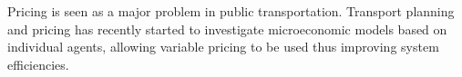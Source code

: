 Pricing is seen as a major problem in public transportation.
Transport planning and pricing has recently started to investigate
microeconomic models based on individual agents, allowing variable pricing to
be used thus improving system efficiencies. \parencite{Emele2013pricing+rural,
Kaddoura2013social+cost, Neumann2011berlin}
